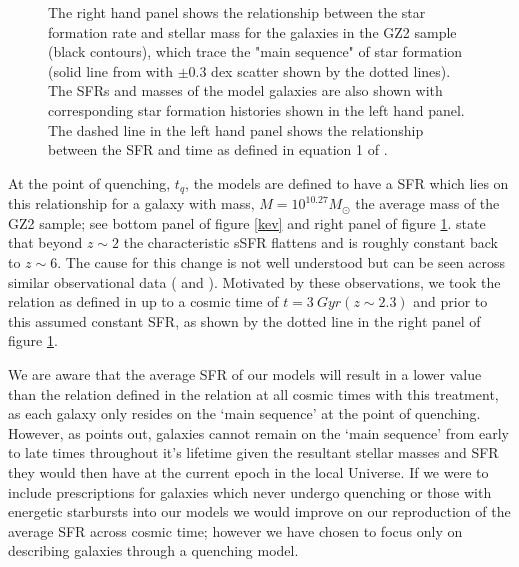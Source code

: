 \documentclass{mn2e}
\begin{document}
\begin{figure}
\caption{The right hand panel shows the relationship between the star formation rate and stellar mass for the galaxies in the GZ2 sample (black contours), which trace the "main sequence" of star formation (solid line from \cite{Peng} with $\pm0.3$ dex scatter shown by the dotted lines). The SFRs and masses of the model galaxies are also shown with corresponding star formation histories shown in the left hand panel. The dashed line in the left hand panel shows the relationship between the SFR and time as defined in equation 1 of \citet{Peng}.}
\label{sfr_mass}
\end{figure}


At the point of quenching, $t_{q}$, the models are defined to have a SFR which lies on this relationship for a galaxy with mass, $M = 10^{10.27} M_{\odot}$ the average mass of the GZ2 sample; see bottom panel of figure \ref{kev} and right panel of figure \ref{sfr_mass}. \citet{Peng} state that beyond $z \sim 2$ the characteristic sSFR flattens and is roughly constant back to $z\sim6$. The cause for this change is not well understood but can be seen across similar observational data (\cite{Gonzalez} and \cite{Beth}). Motivated by these observations, we took the relation as defined in \citet{Peng} up to a cosmic time of $t=3~Gyr (z \sim 2.3)$ and prior to this assumed constant SFR, as shown by the dotted line in the right panel of figure \ref{sfr_mass}.
 
We are aware that the average SFR of our models will result in a lower value than the relation defined in the \citet{Peng} relation at all cosmic times with this treatment, as each galaxy only resides on the `main sequence' at the point of quenching. However, as \citet{Beth} points out, galaxies cannot remain on the `main sequence' from early to late times throughout it's lifetime given the resultant stellar masses and SFR they would then have at the current epoch in the local Universe. If we were to include prescriptions for galaxies which never undergo quenching or those with energetic starbursts into our models we would improve on our reproduction of the average SFR across cosmic time; however we have chosen to focus only on describing galaxies through a quenching model. 
\end{document}
